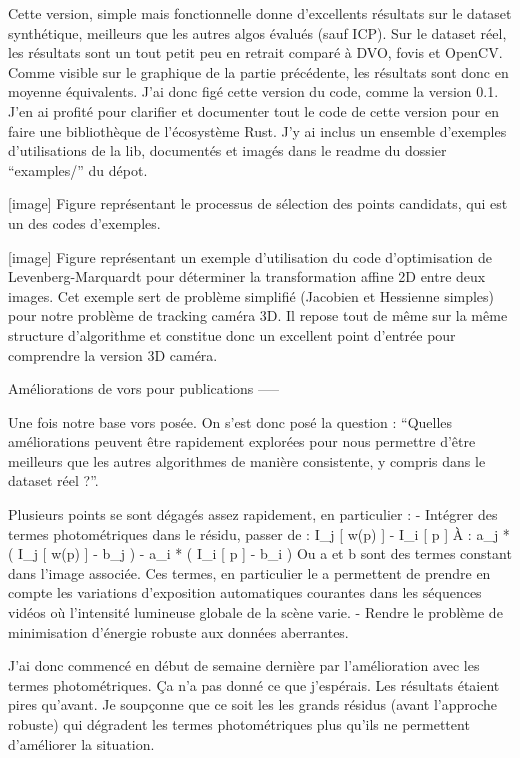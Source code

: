 Cette version, simple mais fonctionnelle donne d’excellents résultats sur le dataset synthétique, meilleurs que les autres algos évalués (sauf ICP). Sur le dataset réel, les résultats sont un tout petit peu en retrait comparé à DVO, fovis et OpenCV. Comme visible sur le graphique de la partie précédente, les résultats sont donc en moyenne équivalents. J’ai donc figé cette version du code, comme la version 0.1. J’en ai profité pour clarifier et documenter tout le code de cette version pour en faire une bibliothèque de l’écosystème Rust. J’y ai inclus un ensemble d’exemples d’utilisations de la lib, documentés et imagés dans le readme du dossier “examples/” du dépot.

[image] Figure représentant le processus de sélection des points candidats, qui est un des codes d’exemples.

[image] Figure représentant un exemple d’utilisation du code d’optimisation de Levenberg-Marquardt pour déterminer la transformation affine 2D entre deux images. Cet exemple sert de problème simplifié (Jacobien et Hessienne simples) pour notre problème de tracking caméra 3D. Il repose tout de même sur la même structure d’algorithme et constitue donc un excellent point d’entrée pour comprendre la version 3D caméra.

Améliorations de vors pour publications
-----

Une fois notre base vors posée. On s’est donc posé la question : “Quelles améliorations peuvent être rapidement explorées pour nous permettre d’être meilleurs que les autres algorithmes de manière consistente, y compris dans le dataset réel ?”.

Plusieurs points se sont dégagés assez rapidement, en particulier :
- Intégrer des termes photométriques dans le résidu, passer de : I\_j [ w(p) ] - I\_i [ p ]
À : a\_j * ( I\_j [ w(p) ] - b\_j )  -  a\_i * ( I\_i [ p ] - b\_i )
Ou a et b sont des termes constant dans l’image associée. Ces termes, en particulier le a permettent de prendre en compte les variations d’exposition automatiques courantes dans les séquences vidéos où l’intensité lumineuse globale de la scène varie.
- Rendre le problème de minimisation d’énergie robuste aux données aberrantes.

J’ai donc commencé en début de semaine dernière par l’amélioration avec les termes photométriques. Ça n’a pas donné ce que j’espérais. Les résultats étaient pires qu’avant. Je soupçonne que ce soit les les grands résidus (avant l’approche robuste) qui dégradent les termes photométriques plus qu’ils ne permettent d’améliorer la situation.

